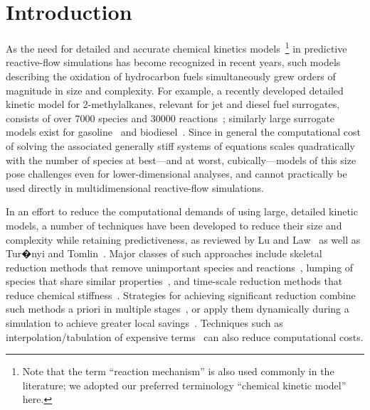 \documentclass[preprint,12pt]{elsarticle}
\begin{document}
\section{Introduction}
\label{sec:intro}

As the need for detailed and accurate chemical kinetics models~\footnote{Note that the term ``reaction mechanism'' is also used commonly in the literature; we adopted our preferred terminology ``chemical kinetic model'' here.} in predictive reactive-flow simulations has become recognized in recent years, such models describing the oxidation of hydrocarbon fuels simultaneously grew orders of magnitude in size and complexity.
For example, a recently developed detailed kinetic model for 2-methylalkanes, relevant for jet and diesel fuel surrogates, consists of over 7000 species and 30000 reactions~\cite{Sarathy:2011kx}; similarly large surrogate models exist for gasoline~\cite{Mehl:2011cn,Mehl:2011jn} and biodiesel~\cite{Herbinet:2010gu}.
Since in general the computational cost of solving the associated generally stiff systems of equations scales quadratically with the number of species at best---and at worst, cubically---models of this size pose challenges even for lower-dimensional analyses, and cannot practically be used directly in multidimensional reactive-flow simulations.

In an effort to reduce the computational demands of using large, detailed kinetic models, a number of techniques have been developed to reduce their size and complexity while retaining predictiveness, as reviewed by Lu and Law~\cite{Lu:2009gh} as well as Tur�nyi and Tomlin~\cite{Turanyi:2014aa}.
Major classes of such approaches include skeletal reduction methods that remove unimportant species and reactions~\cite{Lu:2006bb,Pepiot-Desjardins:2008,Hiremath:2010jw,Niemeyer:2010bt}, lumping of species that share similar properties~\cite{Lu:2007,Ahmed:2007fa,Pepiot:2008kq}, and time-scale reduction methods that reduce chemical stiffness~\cite{Maas:1992ws,Lam:1994ws,Lu:2001ve,Gou:2010}.
Strategies for achieving significant reduction combine such methods a priori in multiple stages~\cite{Lu:2008bi,Niemeyer:2014,Niemeyer:2015wq}, or apply them dynamically during a simulation to achieve greater local savings~\cite{Banerjee:2006,Liang:2009,Shi:2010,Gou:2013eu,Yang:2013ip,Curtis:2015aa}.
Techniques such as interpolation\slash tabulation of expensive terms~\cite{Pope:1997wu} can also reduce computational costs.
\end{document}
